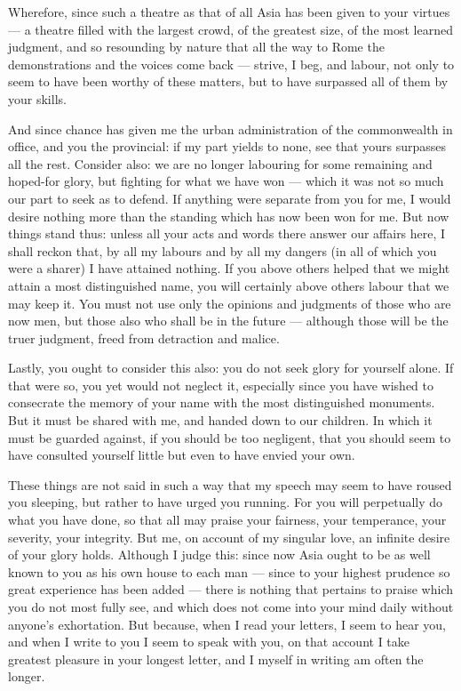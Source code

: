  Wherefore, since such a theatre as that of all Asia has been given to your virtues --- a theatre filled with the largest crowd, of the greatest size, of the most learned judgment, and so resounding by nature that all the way to Rome the demonstrations and the voices come back --- strive, I beg, and labour, not only to seem to have been worthy of these matters, but to have surpassed all of them by your skills.

 And since chance has given me the urban administration of the commonwealth in office, and you the provincial: if my part yields to none, see that yours surpasses all the rest. Consider also: we are no longer labouring for some remaining and hoped-for glory, but fighting for what we have won --- which it was not so much our part to seek as to defend. If anything were separate from you for me, I would desire nothing more than the standing which has now been won for me. But now things stand thus: unless all your acts and words there answer our affairs here, I shall reckon that, by all my labours and by all my dangers (in all of which you were a sharer) I have attained nothing. If you above others helped that we might attain a most distinguished name, you will certainly above others labour that we may keep it. You must not use only the opinions and judgments of those who are now men, but those also who shall be in the future --- although those will be the truer judgment, freed from detraction and malice.

 Lastly, you ought to consider this also: you do not seek glory for yourself alone. If that were so, you yet would not neglect it, especially since you have wished to consecrate the memory of your name with the most distinguished monuments. But it must be shared with me, and handed down to our children. In which it must be guarded against, if you should be too negligent, that you should seem to have consulted yourself little but even to have envied your own.

 These things are not said in such a way that my speech may seem to have roused you sleeping, but rather to have urged you running. For you will perpetually do what you have done, so that all may praise your fairness, your temperance, your severity, your integrity. But me, on account of my singular love, an infinite desire of your glory holds. Although I judge this: since now Asia ought to be as well known to you as his own house to each man --- since to your highest prudence so great experience has been added --- there is nothing that pertains to praise which you do not most fully see, and which does not come into your mind daily without anyone's exhortation. But because, when I read your letters, I seem to hear you, and when I write to you I seem to speak with you, on that account I take greatest pleasure in your longest letter, and I myself in writing am often the longer.

